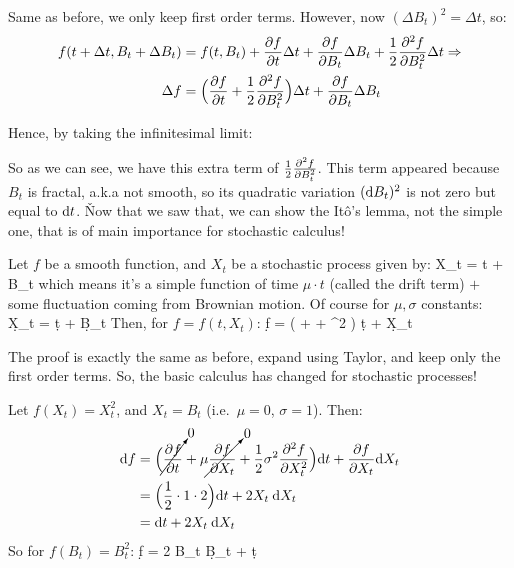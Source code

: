 Same as before, we only keep first order terms. However, now $(\Delta B_{t})^{2} = \Delta t$, so:
\begin{align*}
f(t + \Delta t, B_{t} + \Delta B_{t}) &= f(t, B_{t}) + \frac{\partial f}{\partial t} \Delta t + \frac{\partial f}{\partial B_{t}} \Delta
B_{t} + \frac{1}{2} \frac{\partial^{2} f}{\partial B_{t}^{2}} \Delta t \Rightarrow \\
\Delta f &= \Big( \frac{\partial f}{\partial t} + \frac{1}{2} \frac{\partial^{2} f}{\partial B_{t}^{2}} \Big) \Delta t +
\frac{\partial f}{\partial B_{t}} \Delta B_{t}
\end{align*}

Hence, by taking the infinitesimal limit:
\bse
{} \qquad {}
\ese

So as we can see, we have this extra term of $\frac{1}{2} \frac{\partial^{2} f}{\partial B_{t}^{2}}$. This term appeared
because $B_{t}$ is fractal, a.k.a not smooth, so its quadratic variation $(\mathrm{d} B_{t})^{2}$ is not zero but equal to
$\mathrm{d} t$. \v

Now that we saw that, we can show the It\^o's lemma, not the simple one, that is of main importance for stochastic
calculus!

\bt[It\^o's Lemma]
Let $f$ be a smooth function, and $X_{t}$ be a stochastic process given by:
\bse
X_{t} = \mu \cdot t + \sigma B_{t}
\ese
which means it's a simple function of time $\mu \cdot t$ (called the drift term) $+$ some fluctuation coming from
Brownian motion. Of course for $\mu, \sigma$ constants:
\bse
\d X_{t} = \mu \: \d t + \sigma \: \d B_{t}
\ese
Then, for $f = f(t, X_{t})$:
\bse
\d f = \Big(  + \mu {} +  \sigma^{2} 
\Big) \d t +  \d X_{t}
\ese
\et

The proof is exactly the same as before, expand using Taylor, and keep only the first order terms. So, the basic
calculus has changed for stochastic processes!

\be
Let $f(X_{t}) = X_{t}^{2}$, and $X_{t} = B_{t}$ (i.e.\ $\mu = 0$, $\sigma = 1$). Then:
\begin{align*}
\mathrm{d} f &= \Big( \cancelto{0}{\frac{\partial f}{\partial t}} + \mu \cancelto{0}{\frac{\partial f}{\partial X_{t}}} + \frac{1}{2} \sigma^{2}
\frac{\partial^{2} f}{\partial X_{t}^{2}} \Big) \mathrm{d} t + \frac{\partial f}{\partial X_{t}} \mathrm{d} X_{t} \\
&= \Big( \frac{1}{2} \cdot 1 \cdot 2 \Big) \mathrm{d} t + 2 X_{t} \: \mathrm{d} X_{t} \\
&= \mathrm{d} t + 2 X_{t} \: \mathrm{d} X_{t}
\end{align*}
So for $f(B_{t}) = B_{t}^{2}$:
\bse
\d f = 2 B_{t} \: \d B_{t} + \d t
\ese
\ee

